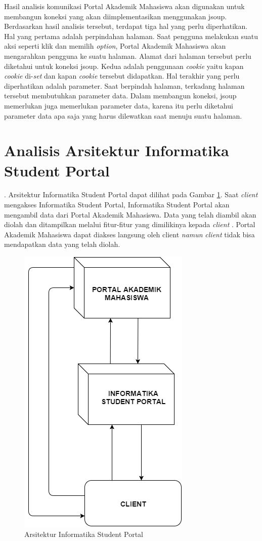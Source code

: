 Hasil analisis komunikasi Portal Akademik Mahasiswa akan digunakan untuk membangun koneksi yang akan diimplementasikan menggunakan jsoup. Berdasarkan hasil analisis tersebut, terdapat tiga hal yang perlu diperhatikan. Hal yang pertama adalah perpindahan halaman. Saat pengguna melakukan suatu aksi seperti klik dan memilih \textit{option}, Portal Akademik Mahasiswa akan mengarahkan pengguna ke suatu halaman. Alamat dari halaman tersebut perlu diketahui untuk koneksi jsoup. Kedua adalah penggunaan \textit{cookie} yaitu kapan \textit{cookie} di-\textit{set} dan kapan \textit{cookie} tersebut didapatkan. Hal terakhir yang perlu diperhatikan adalah parameter. Saat berpindah halaman, terkadang halaman tersebut membutuhkan parameter data. Dalam membangun koneksi, jsoup memerlukan juga memerlukan parameter data, karena itu perlu diketahui parameter data apa saja yang harus dilewatkan saat menuju suatu halaman.

\section{Analisis Arsitektur Informatika Student Portal}.
Arsitektur Informatika Student Portal dapat dilihat pada Gambar \ref{fig:3_ars_portal}. Saat \textit{client} mengakses Informatika Student Portal, Informatika Student Portal akan mengambil data dari Portal Akademik Mahasiswa. Data yang telah diambil akan diolah dan ditampilkan melalui fitur-fitur yang dimilikinya kepada \textit{client} . Portal Akademik Mahasiswa dapat diakses langsung oleh client \textit{namun} \textit{client} tidak bisa mendapatkan data yang telah diolah.

		\begin{figure}[H]
			\centering
			\includegraphics[scale=0.5]{Gambar/arsitekturIFPortal}
			\caption{Arsitektur Informatika Student Portal} 
			\label{fig:3_ars_portal}
		\end{figure}
		
